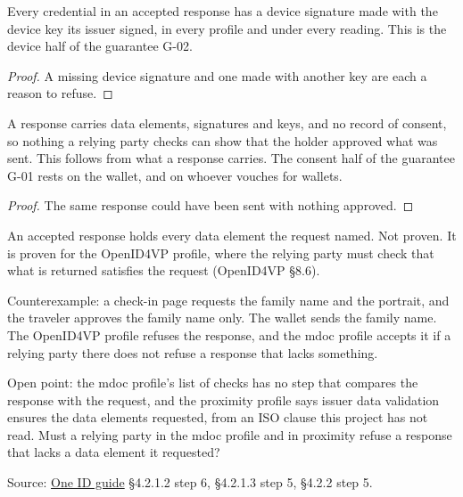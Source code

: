 \begin{theorem}
  \label{thm:accepted-device-key}
  Every credential in an accepted response has a device signature made with the
  device key its issuer signed, in every profile and under every reading.  This
  is the device half of the guarantee G-02.
\end{theorem}
\begin{proof}
  A missing device signature and one made with another key are each a reason to refuse.
\end{proof}

\begin{theorem}
  \label{thm:no-check-shows-consent}
  A response carries data elements, signatures and keys, and no record of
  consent, so nothing a relying party checks can show that the holder approved
  what was sent.  This follows from what a response carries.  The consent half
  of the guarantee G-01 rests on the wallet, and on whoever vouches for
  wallets.
\end{theorem}
\begin{proof}
  The same response could have been sent with nothing approved.
\end{proof}

\begin{theorem}
  \label{thm:accepted-holds-every-requested}
  An accepted response holds every data element the request named.  Not
  proven.  It is proven for the OpenID4VP profile, where the relying party
  must check that what is returned satisfies the request (OpenID4VP §8.6).

  Counterexample: a check-in page requests the family name and the portrait,
  and the traveler approves the family name only.  The wallet sends the family
  name.  The OpenID4VP profile refuses the response, and the mdoc profile
  accepts it if a relying party there does not refuse a response that lacks
  something.

  Open point: the mdoc profile's list of checks has no step that compares the
  response with the request, and the proximity profile says issuer data
  validation ensures the data elements requested, from an ISO clause this
  project has not read.  Must a relying party in the mdoc profile and in
  proximity refuse a response that lacks a data element it requested?

  Source: \href{https://standards.atlassian.net/wiki/spaces/OneID/pages/2947416082/Technical+Implementation+Guide}{One ID guide} §4.2.1.2 step 6, §4.2.1.3 step 5, §4.2.2 step 5.
\end{theorem}

